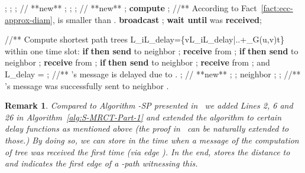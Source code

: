 \documentclass[11pt]{article}
\newtheorem{remark}[theorem]{Remark}
\begin{document}
\begin{algorithm}[!h]
\begin{algorithmic}[1]
\State ; ; ;
\State   // **new**
\If{}
\State ;
\State ;
\State ; // **new**
\EndIf
\State ;
\State \textbf{compute} ; //** According to Fact~\ref{fact:ecc-approx-diam},  is smaller than .
\State \textbf{broadcast} ;
\Else
\State \textbf{wait until}  was \textbf{received};
\EndIf
{}
\end{algorithmic}\caption{Computing  for each  Part 1 (executed by node )}\label{alg:S-MRCT-Part-1}
\end{algorithm}
\newpage
\begin{algorithm} [!h]                    
\begin{algorithmic} [1]                  
\State //** Compute  shortest path trees
\For{}
\For{}
\State L_i\setminus \cap L_{delay}=\emptyset\arg\min\left\{v\in L_i\setminus L_{delay}|\right.\left.\tau[v]+\omega_G(u,v)\geq t\right\}
\EndFor
\State within one time slot:
\newline \hspace*{0.8cm}\textbf{if}  \textbf{then send}  to neighbor ;
\newline  \hspace*{0.8cm}\textbf{receive}  from ;
\newline  \hspace*{0.8cm}\textbf{if}  \textbf{then send}  to neighbor ;
\newline  \hspace*{0.8cm}\textbf{receive}  from ;
\newline  \hspace*{0.8cm} 
\newline  \hspace*{0.8cm}\textbf{if}  \textbf{then send}  to neighbor ; \newline  \hspace*{0.8cm}\textbf{receive}  from ;
\State  and 
\State L_{delay} = \emptyset
\If{}
	\State ;
\EndIf
\For{}
\If{}
\State //** 's message is delayed due to .
\If{}
\State ; // **new**
\State ;
\State ;
\If{}
\State 
\EndIf
\State  neighbor ;
\EndIf
\Else
\State ; //**  's message was successfully sent to neighbor .
\EndIf
\EndFor
\EndFor
\end{algorithmic}
\end{algorithm}
\newpage

\begin{remark}
Compared to Algorithm -SP presented in~\cite{holzer2012optimal} we added Lines 2, 6 and 26 in Algorithm~\ref{alg:S-MRCT-Part-1} and extended the algorithm to certain delay functions as mentioned above (the proof in~\cite{holzer2012optimal} can be naturally extended to those.) By doing so, we can store in  the time when a message of the computation of tree  was received the first time (via edge ). In the end,  stores the distance  to  and  indicates the first edge of a -path witnessing this. 
\end{remark}
\end{document}
